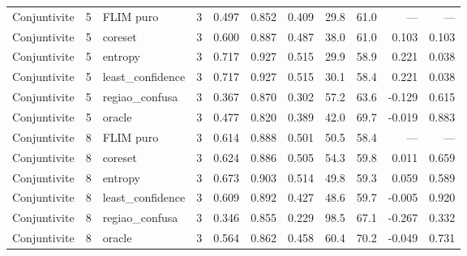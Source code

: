 \begin{tabular}{lllrrrrrrrr}
Conjuntivite & 5 & FLIM puro & 3 & 0.497 & 0.852 & 0.409 & 29.8 & 61.0 & --- & --- \\
Conjuntivite & 5 & coreset & 3 & 0.600 & 0.887 & 0.487 & 38.0 & 61.0 & 0.103 & 0.103 \\
Conjuntivite & 5 & entropy & 3 & 0.717 & 0.927 & 0.515 & 29.9 & 58.9 & 0.221 & 0.038 \\
Conjuntivite & 5 & least\_confidence & 3 & 0.717 & 0.927 & 0.515 & 30.1 & 58.4 & 0.221 & 0.038 \\
Conjuntivite & 5 & regiao\_confusa & 3 & 0.367 & 0.870 & 0.302 & 57.2 & 63.6 & -0.129 & 0.615 \\
Conjuntivite & 5 & oracle & 3 & 0.477 & 0.820 & 0.389 & 42.0 & 69.7 & -0.019 & 0.883 \\
Conjuntivite & 8 & FLIM puro & 3 & 0.614 & 0.888 & 0.501 & 50.5 & 58.4 & --- & --- \\
Conjuntivite & 8 & coreset & 3 & 0.624 & 0.886 & 0.505 & 54.3 & 59.8 & 0.011 & 0.659 \\
Conjuntivite & 8 & entropy & 3 & 0.673 & 0.903 & 0.514 & 49.8 & 59.3 & 0.059 & 0.589 \\
Conjuntivite & 8 & least\_confidence & 3 & 0.609 & 0.892 & 0.427 & 48.6 & 59.7 & -0.005 & 0.920 \\
Conjuntivite & 8 & regiao\_confusa & 3 & 0.346 & 0.855 & 0.229 & 98.5 & 67.1 & -0.267 & 0.332 \\
Conjuntivite & 8 & oracle & 3 & 0.564 & 0.862 & 0.458 & 60.4 & 70.2 & -0.049 & 0.731 \\
\hline
\end{tabular}
